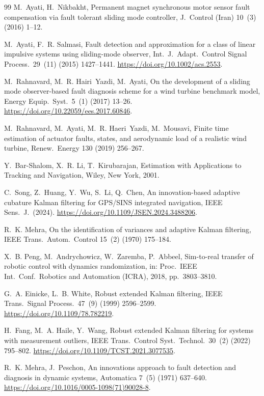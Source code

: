 \documentclass[preprint,12pt,authoryear=false]{elsarticle}
\theoremstyle{remark}\newtheorem{remark}{Remark}
\theoremstyle{plain}\newtheorem{proposition}{Proposition}\newtheorem{lemma}{Lemma}
\theoremstyle{definition}\newtheorem{assumption}{Assumption}
\begin{document}
\begin{thebibliography}{99}
M.~Ayati, H.~Nikbakht,
Permanent magnet synchronous motor sensor fault compensation via fault tolerant sliding mode controller,
J.\ Control (Iran) 10~(3) (2016) 1--12.

M.~Ayati, F.~R. Salmasi,
Fault detection and approximation for a class of linear impulsive systems using sliding-mode observer,
Int.\ J.\ Adapt.\ Control Signal Process.\ 29~(11) (2015) 1427--1441.
\url{https://doi.org/10.1002/acs.2553}.

M.~Rahnavard, M.~R. Hairi~Yazdi, M.~Ayati,
On the development of a sliding mode observer-based fault diagnosis scheme for a wind turbine benchmark model,
Energy Equip.\ Syst.\ 5~(1) (2017) 13--26.
\url{https://doi.org/10.22059/ees.2017.60846}.

M.~Rahnavard, M.~Ayati, M.~R. Haeri~Yazdi, M.~Mousavi,
Finite time estimation of actuator faults, states, and aerodynamic load of a realistic wind turbine,
Renew.\ Energy 130 (2019) 256--267.

Y.~Bar-Shalom, X.~R. Li, T.~Kirubarajan,
Estimation with Applications to Tracking and Navigation,
Wiley, New York, 2001.

C.~Song, Z.~Huang, Y.~Wu, S.~Li, Q.~Chen,
An innovation-based adaptive cubature Kalman filtering for GPS/SINS integrated navigation,
IEEE Sens.\ J.\ (2024).
\url{https://doi.org/10.1109/JSEN.2024.3488206}.

R.~K. Mehra,
On the identification of variances and adaptive Kalman filtering,
IEEE Trans.\ Autom.\ Control 15~(2) (1970) 175--184.

X.~B. Peng, M.~Andrychowicz, W.~Zaremba, P.~Abbeel,
Sim-to-real transfer of robotic control with dynamics randomization,
in: Proc.\ IEEE Int.\ Conf.\ Robotics and Automation (ICRA), 2018, pp.~3803--3810.

G.~A. Einicke, L.~B. White,
Robust extended Kalman filtering,
IEEE Trans.\ Signal Process.\ 47~(9) (1999) 2596--2599.
\url{https://doi.org/10.1109/78.782219}.

H.~Fang, M.~A. Haile, Y.~Wang,
Robust extended Kalman filtering for systems with measurement outliers,
IEEE Trans.\ Control Syst.\ Technol.\ 30~(2) (2022) 795--802.
\url{https://doi.org/10.1109/TCST.2021.3077535}.

R.~K. Mehra, J.~Peschon,
An innovations approach to fault detection and diagnosis in dynamic systems,
Automatica 7~(5) (1971) 637--640.
\url{https://doi.org/10.1016/0005-1098(71)90028-8}.


\end{thebibliography}
\end{document}
